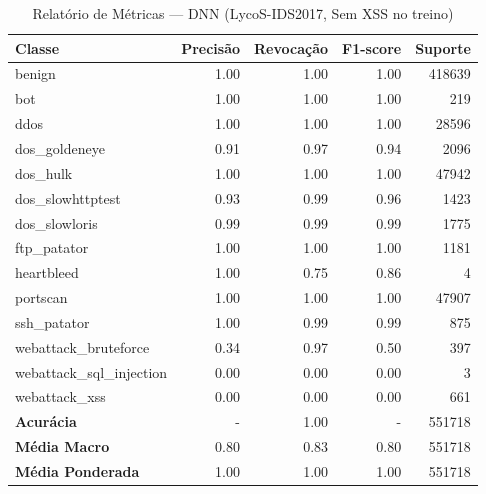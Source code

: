 \begin{table}[H]
    \centering
    \small
    \begin{tabular}{lrrrr}
        \hline
        Classe                    & Precisão & Revocação & F1-score & Suporte \\
        \hline
        benign                    & 1.00     & 1.00      & 1.00     & 418639  \\
        bot                       & 1.00     & 1.00      & 1.00     & 219     \\
        ddos                      & 1.00     & 1.00      & 1.00     & 28596   \\
        dos\_goldeneye            & 0.91     & 0.97      & 0.94     & 2096    \\
        dos\_hulk                 & 1.00     & 1.00      & 1.00     & 47942   \\
        dos\_slowhttptest         & 0.93     & 0.99      & 0.96     & 1423    \\
        dos\_slowloris            & 0.99     & 0.99      & 0.99     & 1775    \\
        ftp\_patator              & 1.00     & 1.00      & 1.00     & 1181    \\
        heartbleed                & 1.00     & 0.75      & 0.86     & 4       \\
        portscan                  & 1.00     & 1.00      & 1.00     & 47907   \\
        ssh\_patator              & 1.00     & 0.99      & 0.99     & 875     \\
        webattack\_bruteforce     & 0.34     & 0.97      & 0.50     & 397     \\
        webattack\_sql\_injection & 0.00     & 0.00      & 0.00     & 3       \\
        webattack\_xss            & 0.00     & 0.00      & 0.00     & 661     \\
        \hline
        \textbf{Acurácia}         & -        & 1.00      & -        & 551718  \\
        \textbf{Média Macro}      & 0.80     & 0.83      & 0.80     & 551718  \\
        \textbf{Média Ponderada}  & 1.00     & 1.00      & 1.00     & 551718  \\
        \hline
    \end{tabular}
    \caption{Relatório de Métricas — DNN (LycoS-IDS2017, Sem XSS no treino)}
    \label{table:dnn_lycos_sem_xss_metricas}
\end{table}
